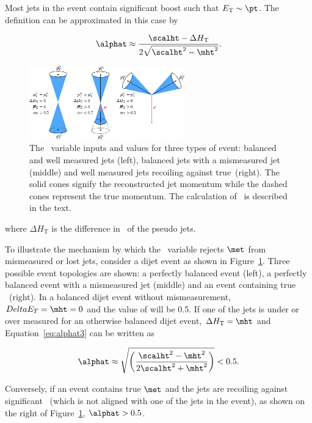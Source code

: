 Most jets in the event contain significant boost such that $E_{\textrm{T}} \sim \pt$. The \alphat 
definition can be approximated in this case by

\begin{equation}
  \label{eq:alphat3}
   \alphat \approx \frac{\scalht - \Delta H_{\textrm{T}}}{2\sqrt{\scalht^2 - \mht^2}}.
\end{equation}

\begin{figure}
\centering
    \includegraphics[width=0.6\textwidth]{./Figures/alphat/alphat_cartoon}
  \caption{\label{fig:alphat_cartoon} The \alphat~variable inputs and values for three types of event: balanced and well measured jets (left), balanced jets with
  a mismeasured jet (middle) and well measured jets recoiling against true~\met (right). The solid cones signify the reconstructed jet momentum while the 
  dashed cones represent the true momentum. The calculation of \alphat~is described in the text.} 
\end{figure}
where $\Delta H_{\textrm{T}}$ is the difference in \pt~of the pseudo jets.

To illustrate the mechanism by which the \alphat~variable rejects $\met$ from mismeasured or lost jets,
consider a dijet event as shown in Figure~\ref{fig:alphat_cartoon}. Three possible event topologies are shown: 
a perfectly balanced event (left), a perfectly balanced event with a mismeasured jet (middle) and an event containing true \met~(right).
In a balanced dijet event without mismeasurement, $Delta E_T = \mht = 0$ and the 
value of \alphat will be 0.5. If one of the jets is under or over measured for an otherwise balanced dijet
event, $\Delta H_{\textrm{T}} = \mht$ and Equation~\ref{eq:alphat3} can be written as 

\begin{equation}
  \label{eq:alphat4}
   \alphat \approx \sqrt{\left(\frac{\scalht^2 - \mht^2}{2\scalht^2 + \mht^2}\right)} < 0.5.
\end{equation}

Conversely, if an event contains true $\met$ and the jets are recoiling against significant~\met 
(which is not aligned with one of the jets in the event), as shown on the right of 
Figure~\ref{fig:alphat_cartoon}, $\alphat > 0.5$. 


